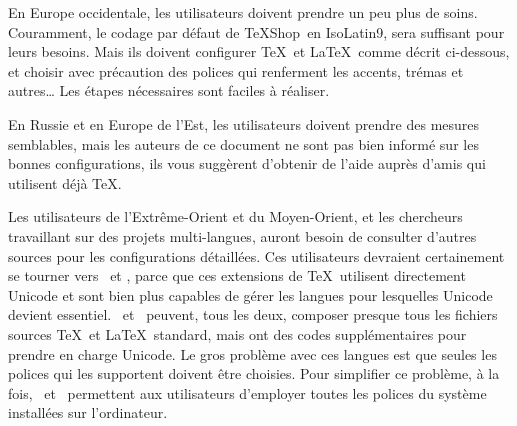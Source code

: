 \documentclass[11pt,french]{article}
\newcommand{\TS}{\textsf{\TeX Shop}}
\newcommand{\acr}[1]{\textsf{#1}}
\newcommand{\cmd}[1]{\textsf{#1}}
\begin{document}
En Europe occidentale, les utilisateurs doivent prendre un peu plus de soins. Couramment, le codage par défaut de \TS\ en \acr{IsoLatin9}, sera suffisant pour leurs besoins. Mais ils doivent configurer \TeX\ et \LaTeX\ comme décrit ci-dessous, et choisir avec précaution des polices qui renferment les accents, trémas et autres… Les étapes nécessaires sont faciles à réaliser.

En Russie et en Europe de l'Est, les utilisateurs doivent prendre des mesures semblables, mais les auteurs de ce document ne sont pas bien informé sur les bonnes configurations, ils vous suggèrent d'obtenir de l'aide auprès d'amis qui utilisent déjà \TeX.

Les utilisateurs de l'Extrême-Orient et du Moyen-Orient, et les chercheurs travaillant sur des projets multi-langues, auront besoin de consulter d'autres sources pour les configurations détaillées. Ces utilisateurs devraient certainement se tourner vers \XeTeX\ et \LuaTeX, parce que ces extensions de \TeX\ utilisent directement \cmd{Unicode} et sont bien plus capables de gérer les langues pour lesquelles \cmd{Unicode} devient essentiel. \XeTeX\ et \LuaTeX\ peuvent, tous les deux, composer presque tous les fichiers sources \TeX\ et \LaTeX\ standard, mais ont des codes supplémentaires pour prendre en charge \cmd{Unicode}. Le gros problème avec ces langues est que seules les polices qui les supportent doivent être choisies. Pour simplifier ce problème, à la fois, \XeTeX\ et \LuaTeX\ permettent aux utilisateurs d'employer toutes les polices du système installées sur l'ordinateur.
\end{document}
